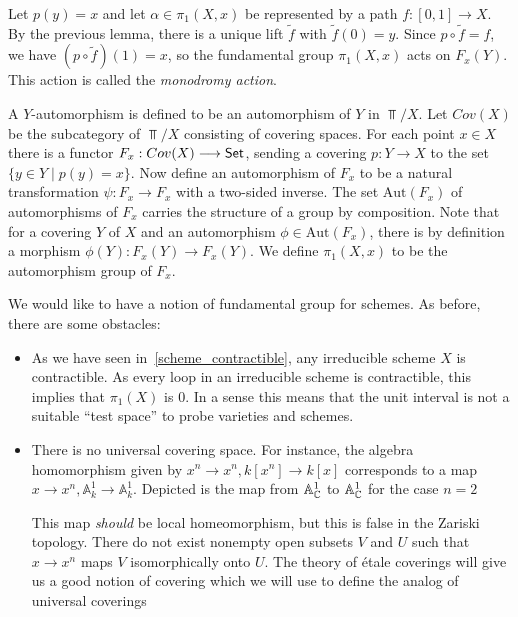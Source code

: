 \begin{construction}
	Let $p(y)=x$ and let $\alpha \in \pi_1(X,x)$ be represented by a path $f: [0,1] \to X$. By the previous lemma, there is a unique lift $\tilde{f}$ with $\tilde{f}(0) = y$. Since $p \circ \tilde{f} = f$, we have $(p \circ \tilde{f})(1) = x$, so the fundamental group $\pi_1(X, x)$ acts on $F_x(Y)$. This action is called the \textit{monodromy action}.
\end{construction}

A $Y$-automorphism is defined to be an automorphism of $Y$ in $\Top/X$. Let $Cov(X)$ be the subcategory of $\Top/X$ consisting of covering spaces. For each point $x \in X$ there is a functor $F_x: Cov(X) \longrightarrow \mathsf{Set}$, sending a covering $p: Y \to X$ to the set $\{y \in Y \mid p(y) = x\}$. Now define an automorphism of $F_x$ to be a natural transformation $\psi: F_x \to F_x$ with a two-sided inverse. The set $\text{Aut}(F_x)$ of automorphisms of $F_x$ carries the structure of a group by composition. Note that for a covering $Y$ of $X$ and an automorphism $\phi \in \text{Aut}(F_x)$, there is by definition a morphism $\phi(Y): F_x(Y) \to F_x(Y)$. We define $\pi_1(X,x)$ to be the automorphism group of $F_x$.

We would like to have a notion of fundamental group for schemes. As before, there are some obstacles:

\begin{itemize}
	\item As we have seen in~\ref{scheme_contractible}, any irreducible scheme $X$ is contractible. As every loop in an irreducible scheme is contractible, this implies that $\pi_1(X)$ is $0$. In a sense this means that the unit interval is not a suitable ``test space'' to probe varieties and schemes.
	\item There is no universal covering space.
	      For instance, the algebra homomorphism given by $x^n \to x^n, k[x^n] \to k[x]$ corresponds to a map $x \to x^n, \mathbb{A}^1_k \to \mathbb{A}^1_k$. Depicted is the map from $\mathbb{A}^1_{\mathbb{C}}$ to $\mathbb{A}^1_{\mathbb{C}}$ for the case $n=2$


	      This map \textit{should} be local homeomorphism, but this is false in the Zariski topology. There do not exist nonempty open subsets $V$ and $U$ such that $x \to x^n$ maps $V$ isomorphically onto $U$. The theory of \'etale coverings will give us a good notion of covering which we will use to define the analog of universal coverings
\end{itemize}

